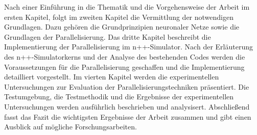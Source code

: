 Nach einer Einführung in die Thematik und die Vorgehensweise der Arbeit im ersten Kapitel, folgt im zweiten Kapitel die Vermittlung der notwendigen Grundlagen. Dazu gehören die Grundprinzipien neuronaler Netze sowie die Grundlagen der Parallelisierung.
Das dritte Kapitel beschreibt die Implementierung der Parallelisierung im n++-Simulator. Nach der Erläuterung des n++-Simulatorkerns und der Analyse des bestehenden Codes werden die Voraussetzungen für die Parallelisierung geschaffen und die Implementierung detailliert vorgestellt.
Im vierten Kapitel werden die experimentellen Untersuchungen zur Evaluation der Parallelisierungstechniken präsentiert. Die Testumgebung, die Testmethodik und die Ergebnisse der experimentellen Untersuchungen werden ausführlich beschrieben und analysisert.
Abschließend fasst das Fazit die wichtigsten Ergebnisse der Arbeit zusammen und gibt einen Ausblick auf mögliche Forschungsarbeiten.